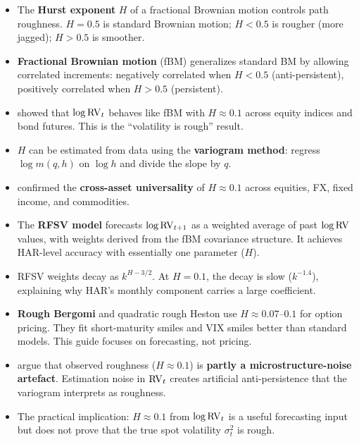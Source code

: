 \begin{itemize}[nosep]
  \item The \textbf{Hurst exponent} $H$ of a fractional Brownian motion controls path roughness. $H = 0.5$ is standard Brownian motion; $H < 0.5$ is rougher (more jagged); $H > 0.5$ is smoother.

  \item \textbf{Fractional Brownian motion} (fBM) generalizes standard BM by allowing correlated increments: negatively correlated when $H < 0.5$ (anti-persistent), positively correlated when $H > 0.5$ (persistent).

  \item \citet{GJR2018} showed that $\log \operatorname{RV}_t$ behaves like fBM with $H \approx 0.1$ across equity indices and bond futures. This is the ``volatility is rough'' result.

  \item $H$ can be estimated from data using the \textbf{variogram method}: regress $\log m(q,h)$ on $\log h$ and divide the slope by $q$.

  \item \citet{BLP2022} confirmed the \textbf{cross-asset universality} of $H \approx 0.1$ across equities, FX, fixed income, and commodities.

  \item The \textbf{RFSV model} forecasts $\log \operatorname{RV}_{t+1}$ as a weighted average of past $\log \operatorname{RV}$ values, with weights derived from the fBM covariance structure. It achieves HAR-level accuracy with essentially one parameter ($H$).

  \item RFSV weights decay as $k^{H - 3/2}$. At $H = 0.1$, the decay is slow ($k^{-1.4}$), explaining why HAR's monthly component carries a large coefficient.

  \item \textbf{Rough Bergomi} \citep{BFG2016} and quadratic rough Heston use $H \approx 0.07$--$0.1$ for option pricing. They fit short-maturity smiles and VIX smiles better than standard models. This guide focuses on forecasting, not pricing.

  \item \citet{ContDas2024} argue that observed roughness ($H \approx 0.1$) is \textbf{partly a microstructure-noise artefact}. Estimation noise in $\operatorname{RV}_t$ creates artificial anti-persistence that the variogram interprets as roughness.

  \item The practical implication: $H \approx 0.1$ from $\log \operatorname{RV}_t$ is a useful forecasting input but does not prove that the true spot volatility $\sigma^2_t$ is rough.


\end{itemize}
